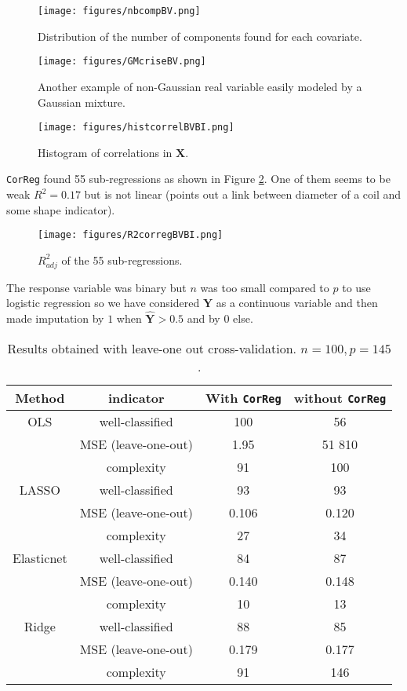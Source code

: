 \documentclass[12pt,a4paper]{report}
\begin{document}
		
		\begin{figure}[h!]
	\begin{minipage}[t]{.30\linewidth}
			\texttt{[image: figures/nbcompBV.png]}%
			\caption{Distribution of the number of components found for each covariate.}\label{graphMixmodcompnumber}
	\end{minipage} \hfill
	\begin{minipage}[t]{.30\linewidth}
			\texttt{[image: figures/GMcriseBV.png]}%
			\caption{Another example of non-Gaussian real variable easily modeled by a Gaussian mixture.}
	\end{minipage} \hfill
   \begin{minipage}[t]{.30\linewidth}
			\texttt{[image: figures/histcorrelBVBI.png]} 
			\caption{Histogram of correlations in $\boldsymbol{X}$.} \label{compareMSEBV}
   \end{minipage}
\end{figure} 
  		
  			
{\tt CorReg} found 55 sub-regressions as shown in Figure \ref{R2bv}. One of them seems to be weak $R^2=0.17$ but is not linear (points out a link between diameter of a coil and some shape indicator).	

\begin{figure}[h!]
\centering
	\texttt{[image: figures/R2corregBVBI.png]} 
			\caption{$R^2_{adj}$ of the 55 sub-regressions.}\label{R2bv}
\end{figure}
The response variable was binary but $n$ was too small compared to $p$ to use logistic regression so we have considered $\boldsymbol{Y}$ as a continuous variable and then made imputation by $1$ when $\hat{\boldsymbol{Y}}>0.5$ and by $0$ else.


\begin{table}[h!]
\centering
\begin{tabular}{|c c|c|c|}
	\hline 
	Method& indicator& With {\tt CorReg} & without {\tt CorReg} \\ 
	\hline
	OLS & well-classified & 100& 56 \\
		& MSE (leave-one-out)& 1.95& 51 810\\
		& complexity & 91& 100 \\
	\hline 
		LASSO & well-classified &93 &93 \\
		& MSE (leave-one-out)& 0.106 & 0.120\\
		& complexity & 27&34\\
	\hline 
		Elasticnet & well-classified &84 &87 \\
		& MSE (leave-one-out)&0.140 &0.148\\
		& complexity &10 &13\\
	\hline 
		Ridge & well-classified &88 &85 \\
		& MSE (leave-one-out)& 0.179 & 0.177\\
		& complexity &91 &146\\
	\hline 
\end{tabular} 
\caption{Results obtained with leave-one out cross-validation. $n=100, p=145$.}	
\end{table}
\end{document}
